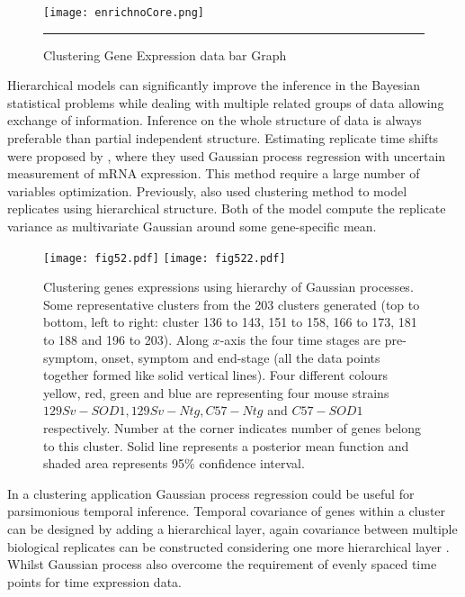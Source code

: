 \begin{figure}
	\centering
		\texttt{[image: enrichnoCore.png]}
		\rule{35em}{0.5pt}
	\caption[Clustering Gene Expression data bar Graph]
		{Clustering Gene Expression data bar Graph}
	\label{fig:enrichNoCoregionalization}
\end{figure}

Hierarchical models can significantly improve the inference in the Bayesian statistical problems \cite{Gelman:2004} while dealing with multiple related groups of data allowing exchange of information. Inference on the whole structure of data is always preferable than partial independent structure. Estimating replicate time shifts were proposed by \cite{Liu:2010}, where they used Gaussian process regression with uncertain measurement of mRNA expression. This method require a large number of variables optimization. Previously, \cite{Ng:2006} also \cite{Medvedovic:2004} used clustering method to model replicates using hierarchical structure. Both of the model compute the replicate variance as multivariate Gaussian around some gene-specific mean.

\begin{figure}
 \begin{center}
    \texttt{[image: fig52.pdf]}
    \texttt{[image: fig522.pdf]}
    \caption [Clustering genes expressions using hierarchy of Gaussian processes] 
    {Clustering genes expressions using hierarchy of Gaussian processes. Some representative clusters from the 203 clusters generated (top to bottom, left to right: cluster 136 to 143, 151 to 158, 166 to 173, 181 to 188 and 196 to 203). Along $x$-axis the four time stages are pre-symptom, onset, symptom and end-stage (all the data points together formed like solid vertical lines). Four different colours yellow, red, green and blue are representing four mouse strains $129Sv-SOD1, 129Sv-Ntg, C57-Ntg$ and $C57-SOD1$ respectively. Number at the corner indicates number of genes belong to this cluster. Solid line represents a posterior mean function and shaded area represents 95\% confidence interval.\label{fig:fewClusters}}
 \end{center}
\end{figure}

In a clustering application Gaussian process regression could be useful for parsimonious temporal inference. Temporal covariance of genes within a cluster can be designed by adding a hierarchical layer, again covariance between multiple biological replicates can be constructed considering one more hierarchical layer \cite{Hensman:2013}. Whilst Gaussian process also overcome the requirement of evenly spaced time points for time expression data.

